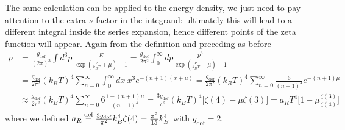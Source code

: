 The same calculation can be applied to the energy density, we just need to pay attention to the extra $\nu$ factor in the integrand: ultimately this will lead to a different integral inside the series expansion, hence different points of the zeta function will appear. Again from the definition and preceding as before
\begin{align}
    \rho&=\frac{g_\text{dof}}{(2\pi)^3}\int d^3p\ \frac{E}{\exp(\frac{\nu}{k_BT}+\mu)-1}=\frac{g_\text{dof}}{2\pi^2}\int_0^\infty dp \frac{p^3}{\exp(\frac{\nu}{k_BT}+\mu)-1}\nonumber\\
    &=\frac{g_\text{dof}}{2\pi^2}(k_BT)^4\sum_{n=0}^{\infty}\int_0^\infty dx\ x^3e^{-(n+1)(x+\mu)}\nonumber=\frac{g_\text{dof}}{2\pi^2}(k_BT)^4\sum_{n=0}^{\infty}\frac{6}{(n+1)^4}e^{-(n+1)\mu}\\&\approx\frac{g_\text{dof}}{2\pi^2}(k_BT)^4\sum_{n=0}^{\infty}6\frac{1-(n+1)\mu}{(n+1)^4}=\frac{3g_\text{dof}}{\pi^2}(k_BT)^4\big[\zeta(4)-\mu\zeta(3)\big]=a_RT^4\bigg[1-\mu\frac{\zeta(3)}{\zeta(4)}\bigg]\,\label{eq:SmallChemicalPotential_rho}
\end{align}
where we defined $a_R\stackrel{\text{def}}{=}\frac{3g_\text{dof}}{\pi^2}k_B^4\zeta(4)=\frac{\pi^2}{15}k_B^4$ with $g_\text{dof}=2$.\\